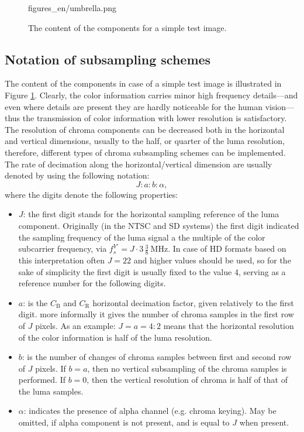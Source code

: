 \begin{figure}[]
	\centering
	\begin{overpic}[width = 1\columnwidth ]{figures_en/umbrella.png}
 	\end{overpic}
	\caption{The content of the \ycbcr components for a simple test image.}
	\label{Fig:umbrella}
\end{figure}

\subsection*{Notation of subsampling schemes}
The content of the \ycbcr components in case of a simple test image is illustrated in Figure \ref{Fig:umbrella}.
Clearly, the color information carries minor high frequency details---and even where details are present they are hardly noticeable for the human vision---thus the transmission of color information with lower resolution is satisfactory.
The resolution of chroma components can be decreased both in the horizontal and vertical dimensions, usually to the half, or quarter of the luma resolution, therefore, different types of chroma subsampling schemes can be implemented.
The rate of decimation along the horizontal/vertical dimension are usually denoted by using the following notation:
\begin{equation}
J : a : b : \alpha,
\end{equation}
where the digits denote the following properties:
\begin{itemize}
\item $J$: the first digit stands for the horizontal sampling reference of the luma component.
Originally (in the NTSC and SD systems) the first digit indicated the sampling frequency of the luma signal a the multiple of the color subcarrier frequency, via $f^{Y'}_s = J \cdot 3\,\frac{3}{8}~\mathrm{MHz}$.
In case of HD formats based on this interpretation often $J=22$ and higher values should be used, so for the sake of simplicity the first digit is usually fixed to the value 4, serving as a reference number for the following digits.
\item $a$: is the $C_{\mathrm{B}}$ and $C_{\mathrm{R}}$ horizontal decimation factor, given relatively to the first digit.
more informally it gives  the number of chroma samples in the first row of $J$ pixels.
As an example: $J=a = 4:2$ means that the horizontal resolution of the color information is half of the luma resolution.
\item $b$: is the number of changes of chroma samples between first and second row of $J$ pixels.
If $b=a$, then no vertical subsampling of the chroma samples is performed.
If $b=0$, then the vertical resolution of chroma is half of that of the luma samples.
\item $\alpha$: indicates the presence of alpha channel (e.g. chroma keying).
May be omitted, if alpha component is not present, and is equal to $J$ when present.
\end{itemize}
